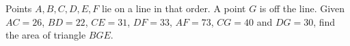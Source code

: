 Points $A,B,C,D,E,F$ lie on a line in that order. A point $G$ is off the line. Given $AC=26$, $BD=22$, $CE=31$, $DF=33$, $AF=73$, $CG=40$ and $DG=30$, find the area of triangle $BGE$.
